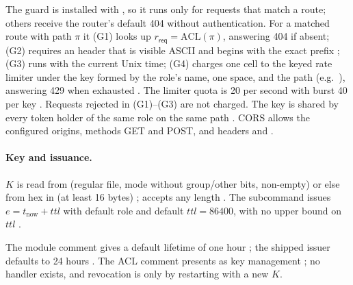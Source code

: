\begin{definition}[Guard]
\label{def:app-guard}
The guard is installed with 
, so it runs only for requests that match a
route; others receive the router's default 404 without authentication. For a
matched route with path $\pi$ it (G1) looks up $r_{\mathsf{req}} =
\mathrm{ACL}(\pi)$, answering 404 if absent; (G2) requires an
 header that is visible ASCII and begins with the exact
prefix ; (G3) runs  with the current Unix
time; (G4) charges one cell to the keyed rate limiter under the key
formed by the role's  name, one space, and the path
(e.g.\ ), answering 429 when exhausted
. The limiter quota is 20 per second
with burst 40 per key . Requests
rejected in (G1)--(G3) are not charged. The key is shared by every token
holder of the same role on the same path . CORS allows the
configured origins, methods GET and POST, and headers 
and  .
\end{definition}

\paragraph{Key and issuance.} $K$ is read from 
(regular file, mode without group/other bits, non-empty) or else from hex in
 (at least 16 bytes)
;  accepts any
length . The  subcommand
issues $e = t_{\mathrm{now}} + \mathit{ttl}$ with default role 
and default $\mathit{ttl}=86400$, with no upper bound on $\mathit{ttl}$
 .

\begin{specdelta}
\label{delta:app-token}
The module comment gives a default lifetime of one hour
; the shipped issuer defaults to 24 hours
. The ACL comment presents
 as key management
; no handler exists, and revocation is
only by restarting with a new $K$.
\end{specdelta}


